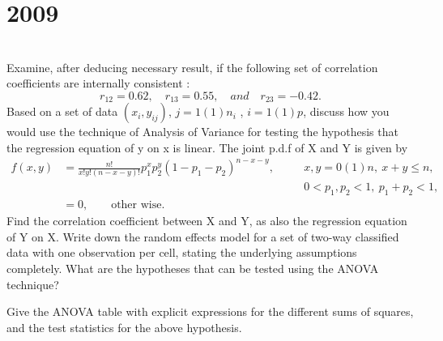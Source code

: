 \section*{2009}
\vspace{-.5cm}
\hrulefill \smallskip\\
 Examine, after deducing necessary result, if the following set of correlation coefficients are internally consistent :
\[ r_{12} = 0.62, \quad r_{13}= 0.55, \quad and \quad r_{23} = -0.42. \]
 Based on a set of data $(x_i, y_{ij})$, $j = 1(1)n_i$ , $i = 1(1)p$, discuss how you would use the technique of Analysis of Variance for testing the hypothesis that the regression equation of y on x is linear.
\myline
{} The joint p.d.f of X and Y is given by 
\[  \begin{aligned} f(x,y)& =
\frac{n!}{x!y!(n-x-y)!}p_1^xp_2^y(1-p_1-p_2)^{n-x-y}, \quad &&x,y = 0(1)n,\: x + y \leq n,\\
&  &&0 <p_1,p_2 <1,\: p_1 + p_2 < 1, \\
 &=0, \qquad \text{other wise.}
\end{aligned} \] Find the correlation coefficient between X and Y, as also the regression equation of Y on X.
\myline
{} Write down the random effects model for a set of two-way classified data with one observation per cell, stating the underlying assumptions completely. What are the hypotheses that can be tested using the ANOVA technique?
 
Give the ANOVA table with explicit expressions for the different sums of squares, and the test statistics for the above hypothesis. 
